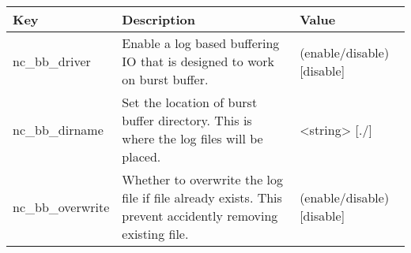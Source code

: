\begin{table}
    \begin{tabular}{lll}
    Key               & Description                                                                                               & Value                      \\ \hline
    nc\_bb\_driver    & Enable a log based buffering IO that is designed to work on burst buffer.                                 & (enable/disable) [disable] \\
    nc\_bb\_dirname   & Set the location of burst buffer directory. This is where the log files will be placed.                   & <string> [./]              \\ \hline
    nc\_bb\_overwrite & Whether to overwrite the log file if file already exists. This prevent accidently removing existing file. & (enable/disable) [disable] \\
    \end{tabular}
\end{table}